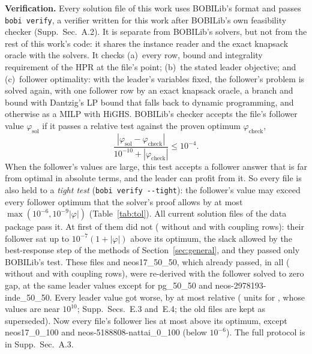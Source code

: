 \documentclass[]{spie}  %
\theoremstyle{plain}
\newcommand{\supp}[1]{Supp.\ Sec.~#1}
\newcommand{\code}[1]{\texttt{#1}}
\newcommand{\inst}[1]{\mbox{#1}}             %
\begin{document}
\textbf{Verification.} Every solution file of this work uses BOBILib's format and passes
\code{bobi verify}, a verifier written for this work after BOBILib's own feasibility checker
(\supp{A.2}). It is separate from BOBILib's solvers, but not from the rest of this work's code: it
shares the instance reader and the exact knapsack oracle with the solvers. It checks (a)~every
row, bound and integrality requirement of the HPR at the file's point; (b)~the stated leader
objective; and (c)~follower optimality: with the leader's variables fixed, the follower's problem
is solved again, with one follower row by an exact knapsack oracle, a branch and bound with
Dantzig's LP bound that falls back to dynamic
programming,\cite{dantzig1957discrete,martello1990knapsack} and otherwise as a MILP with HiGHS.\cite{huangfu2018parallelizing} BOBILib's checker accepts the
file's follower value $\varphi_{\mathrm{sol}}$ if it passes a relative test against the proven
optimum $\varphi_{\mathrm{check}}$,
\begin{equation}\label{eq:tol}
\frac{|\varphi_{\mathrm{sol}}-\varphi_{\mathrm{check}}|}{10^{-10}+|\varphi_{\mathrm{check}}|}\le 10^{-4}.
\end{equation}
When the follower's values are large, this test accepts a follower answer that is far from
optimal in absolute terms, and the leader can profit from it. So every file is also held to a
\emph{tight test} (\code{bobi verify -{}-tight}): the follower's value may exceed every follower
optimum that the solver's proof allows by at most $\max(10^{-6},10^{-9}|\varphi|)$
(Table~\ref{tab:tol}). All \NumTightFiles{} current solution files of the data package pass it.
At first \NumTightSupersededBench{} of them did not (\NumTightSupersededGeneral{} without and
\NumTightSupersededCoupledBench{} with coupling rows): their follower sat up to
$10^{-7}(1+|\varphi|)$ above its optimum, the slack allowed by the best-response step of the
methods of Section~\ref{sec:general}, and they passed only BOBILib's test. These files and
\inst{neos17\_50\_50}, which already passed, \NumTightSuperseded{} in all
(\NumGeneralTightened{} without and \NumCoupledTightened{} with coupling rows), were re-derived with
the follower solved to zero gap, at the same leader values except for \inst{pg\_50\_50} and
\inst{neos-2978193-inde\_50\_50}. Every leader value got worse, by at most \TightWorseMaxRel{}
relative (\TightWorseMaxAbs{} units for \inst{\TightWorseMaxAbsName}, whose values are near
$10^{10}$; Supp.\ Secs.~E.3 and~E.4; the old files are kept as superseded). Now every file's
follower lies at most \TightMaxSlackOther{} above its optimum, except \inst{neos17\_0\_100} and
\inst{neos-5188808-nattai\_0\_100} (below $10^{-6}$). The full protocol is in \supp{A.3}.
\end{document}
